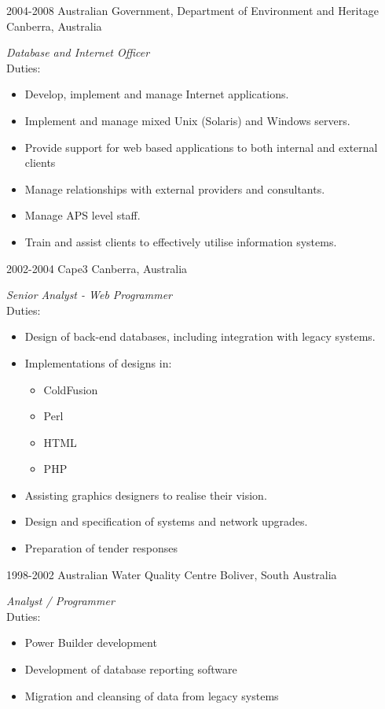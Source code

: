 \documentclass[]{friggeri-cv} %
\begin{document}
\begin{entrylist}
\entry
{2004-2008}
{Australian Government, Department of Environment and Heritage}
{Canberra, Australia}
{\emph{Database and Internet Officer} \\
Duties:
\begin{itemize}
\item Develop, implement and manage Internet applications.
\item Implement and manage mixed Unix (Solaris) and Windows servers.
\item Provide support for web based applications to both internal and external clients
\item Manage relationships with external providers and consultants.
\item Manage APS level staff.
\item Train and assist clients to effectively utilise information systems.
\end{itemize}}
\entry
{2002-2004}
{Cape3}
{Canberra, Australia}
{\emph{Senior Analyst - Web Programmer} \\
Duties:
\begin{itemize}
\item Design of back-end databases, including integration with legacy systems.
\item Implementations of designs in:
\begin{itemize}
\item ColdFusion
\item Perl
\item HTML
\item PHP
\end{itemize}
\item Assisting graphics designers to realise their vision.
\item Design and specification of systems and network upgrades.
\item Preparation of tender responses
\end{itemize}}
\entry
{1998-2002}
{Australian Water Quality Centre}
{Boliver, South Australia}
{\emph{Analyst / Programmer} \\
Duties:
\begin{itemize}
\item Power Builder development
\item Development of database reporting software
\item Migration and cleansing of data from legacy systems

\end{itemize}}
\end{entrylist}
\end{document}
